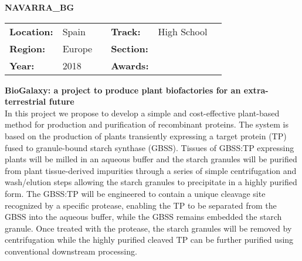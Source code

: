 \textbf{\uppercase{Navarra\_BG}}
\FloatBarrier
\begin{table}[h]
\begin{tabular}{lp{2.5cm}llll}
\textbf{Location:} & Spain & \multicolumn{1}{|l}{} & \textbf{Track:}   & High School \\
\textbf{Region:}   & Europe   & \multicolumn{1}{|l}{} & \textbf{Section:} &  \\
\textbf{Year:}     & 2018   & \multicolumn{1}{|l}{} & \textbf{Awards:}  &
\end{tabular}
\end{table}
\FloatBarrier
\noindent	\textbf{BioGalaxy: a project to produce plant biofactories for an extra-terrestrial future} \vspace{.2cm}\\
In this project we propose to develop a simple and cost-effective plant-based method for production and purification of recombinant proteins. 
The system is based on the production of plants transiently expressing a target protein (TP) fused to granule-bound starch synthase (GBSS). Tissues of GBSS:TP expressing plants will be milled in an aqueous buffer and the starch granules will be purified from plant tissue-derived impurities through a series of simple centrifugation and wash/elution steps allowing the starch granules to precipitate in a highly purified form. The GBSS:TP will be engineered to contain a unique cleavage site recognized by a specific protease, enabling the TP to be separated from the GBSS into the aqueous buffer, while the GBSS remains embedded the starch granule. Once treated with the protease, the starch granules will be removed by centrifugation while the highly purified cleaved TP can be further purified using conventional downstream processing.
\vspace{2cm} $ $
\pagebreak

